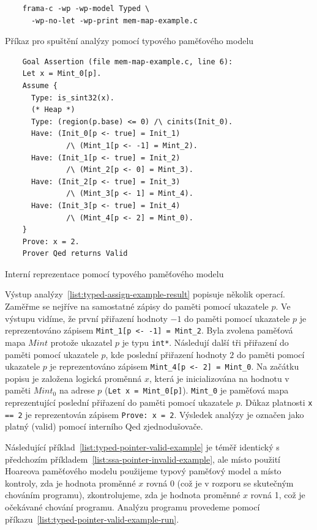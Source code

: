 \begin{listing}[H]
    \begin{verbatim}
    frama-c -wp -wp-model Typed \
      -wp-no-let -wp-print mem-map-example.c
    \end{verbatim}
    \caption{Příkaz pro spuštění analýzy pomocí typového paměťového modelu}
    \label{list:typed-assign-example-run}
\end{listing}

\begin{listing}[H]
    \begin{verbatim}
    Goal Assertion (file mem-map-example.c, line 6):
    Let x = Mint_0[p].
    Assume {
      Type: is_sint32(x).
      (* Heap *)
      Type: (region(p.base) <= 0) /\ cinits(Init_0).
      Have: (Init_0[p <- true] = Init_1)
              /\ (Mint_1[p <- -1] = Mint_2).
      Have: (Init_1[p <- true] = Init_2)
              /\ (Mint_2[p <- 0] = Mint_3).
      Have: (Init_2[p <- true] = Init_3)
              /\ (Mint_3[p <- 1] = Mint_4).
      Have: (Init_3[p <- true] = Init_4)
              /\ (Mint_4[p <- 2] = Mint_0).
    }
    Prove: x = 2.
    Prover Qed returns Valid
    \end{verbatim}
    \caption{Interní reprezentace pomocí typového paměťového modelu}
    \label{list:typed-assign-example-result}
\end{listing}

Výstup analýzy~\ref{list:typed-assign-example-result} popisuje několik operací.
Zaměřme se nejříve na samostatné zápisy do paměti pomocí ukazatele $p$.
Ve výstupu vidíme, že první přiřazení hodnoty $-1$ do paměti pomocí ukazatele $p$
je reprezentováno zápisem \texttt{Mint\_1[p <- -1] = Mint\_2}.
Byla zvolena paměťová mapa $Mint$ protože ukazatel $p$ je typu \texttt{int*}.
Následují další tři přiřazení do paměti pomocí ukazatele $p$,
kde poslední přiřazení hodnoty $2$ do paměti pomocí ukazatele $p$ je reprezentováno zápisem
\texttt{Mint\_4[p <- 2] = Mint\_0}.
Na začátku popisu je založena logická proměnná $x$,
která je inicializována na hodnotu v paměti $Mint_0$ na adrese $p$ (\texttt{Let x = Mint\_0[p]}).
\texttt{Mint\_0} je paměťová mapa reprezentující poslední přiřazení do paměti pomocí ukazatele $p$.
Důkaz platnosti \texttt{x == 2} je reprezentován zápisem \texttt{Prove: x = 2}.
Výsledek analýzy je označen jako platný (valid) pomocí interního Qed zjednodušovače.

Následující příklad~\ref{list:typed-pointer-valid-example} je téměř identický
s předchozím příkladem~\ref{list:ssa-pointer-invalid-example},
ale místo použití Hoareova paměťového modelu použijeme typový paměťový model
a místo kontroly, zda je hodnota proměnné $x$ rovná 0 (což je v rozporu se skutečným chováním programu),
zkontrolujeme, zda je hodnota proměnné $x$ rovná 1, což je očekávané chování programu.
Analýzu programu provedeme pomocí příkazu~\ref{list:typed-pointer-valid-example-run}.

